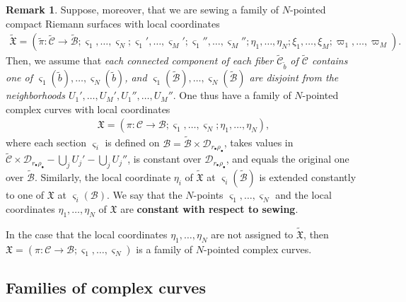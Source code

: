 \documentclass[12pt,b5paper,notitlepage]{report}
\theoremstyle{definition}
\newtheorem{rem}[df]{Remark}
\theoremstyle{plain}
\newcommand{\fk}{\mathfrak}
\newcommand{\mc}{\mathcal}
\newcommand{\wtd}{\widetilde}
\newcommand{\sgm}{\varsigma}
\newcommand{\blt}{\bullet}
\numberwithin{equation}{section}
\begin{document}
\begin{rem}\label{lb39}
Suppose, moreover, that we are sewing a family of $N$-pointed compact Riemann surfaces with local coordinates
\begin{align*}
\wtd{\fk X}=(\wtd\pi:\wtd{\mc C}\rightarrow\wtd{\mc B};\sgm_1,\dots,\sgm_N;\sgm_1',\dots,\sgm_M';\sgm_1'',\dots,\sgm_M'';\eta_1,\dots,\eta_N;\xi_1,\dots,\xi_M;\varpi_1,\dots,\varpi_M).
\end{align*}
Then, we assume that \emph{each connected component of each fiber $\wtd{\mc C}_{\wtd b}$ of $\wtd{\mc C}$ contains one of $\sgm_1(\wtd b),\dots,\sgm_N(\wtd b)$, and  $\sgm_1(\wtd{\mc B}),\dots,\sgm_N(\wtd{\mc B})$ are disjoint from the neighborhoods $U_1',\dots,U_M',U_1'',\dots,U_M''$}. One thus have a family of $N$-pointed complex curves with local coordinates
\begin{align*}
\fk X=(\pi:\mc C\rightarrow\mc B;\sgm_1,\dots,\sgm_N;\eta_1,\dots,\eta_N),
\end{align*}
where each section $\sgm_i$ is defined on $\mc B=\wtd{\mc B}\times\mc D_{r_\blt\rho_\blt}$, takes values in $\wtd {\mc C}\times\mc D_{r_\blt\rho_\blt}-\bigcup_j U_j'-\bigcup_j U_j''$, is constant over $\mc D_{r_\blt\rho_\blt}$, and equals the original one  over  $\wtd{\mc B}$. Similarly, the local coordinate $\eta_i$ of $\wtd{\fk X}$ at $\sgm_i(\wtd{\mc B})$ is extended constantly to one of $\fk X$ at $\sgm_i(\mc B)$. We say that the $N$-points $\sgm_1,\dots,\sgm_N$ and the local coordinates $\eta_1,\dots,\eta_N$ of $\fk X$ are \textbf{constant with respect to sewing}.

In the case that the local coordinates $\eta_1,\dots,\eta_N$ are not assigned to $\wtd{\fk X}$, then $\fk X=(\pi:\mc C\rightarrow\mc B;\sgm_1,\dots,\sgm_N)$ is a family of $N$-pointed complex curves.
\end{rem}

 


\subsection*{Families of complex curves}
\end{document}
